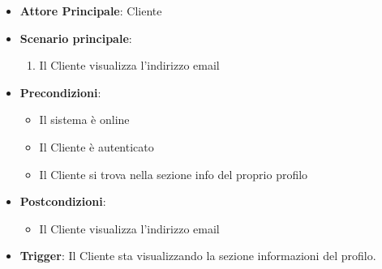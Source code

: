 \label{uc_07.3}
\begin{itemize}
    \item \textbf{Attore Principale}: Cliente
    \item \textbf{Scenario principale}:
            \begin{enumerate}
                \item Il Cliente visualizza l'indirizzo email
            \end{enumerate}
    \item \textbf{Precondizioni}:
            \begin{itemize}
                \item Il sistema è online
                \item Il Cliente è autenticato
                \item Il Cliente si trova nella sezione info del proprio profilo
            \end{itemize}      
    \item \textbf{Postcondizioni}:
            \begin{itemize}
                \item Il Cliente visualizza l'indirizzo email
            \end{itemize}
    \item \textbf{Trigger}: Il Cliente sta visualizzando la sezione informazioni del profilo.
\end{itemize}